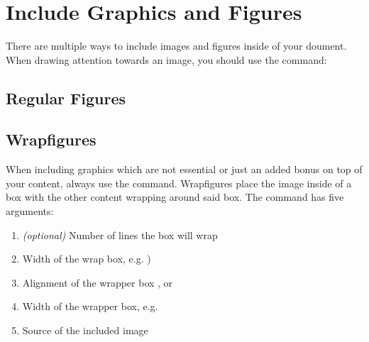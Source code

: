 \documentclass[
    narrow,
    fontstyle=light,
    babelparam=ngerman
]{elite}
\begin{document}

\newpage

\section{Include Graphics and Figures}

There are multiple ways to include images and figures inside of your doument.
When drawing attention towards an image, you should use the  command:

\subsection{Regular Figures}


\begin{CodeListing}
\end{CodeListing}

\subsection{Wrapfigures}


When including graphics which are not essential or just an added bonus on top of your content,
always use the  command. Wrapfigures place the image inside of
a box with the other content wrapping around said box. The  command has
five arguments:
\begin{enumerate}
    \item \textit{(optional)} Number of lines the box will wrap
    \item Width of the wrap box, e.g. )
    \item Alignment of the wrapper box ,  or 
    \item Width of the wrapper box, e.g. 
    \item Source of the included image
\end{enumerate}

\begin{CodeListing}
\end{CodeListing}
\end{document}
